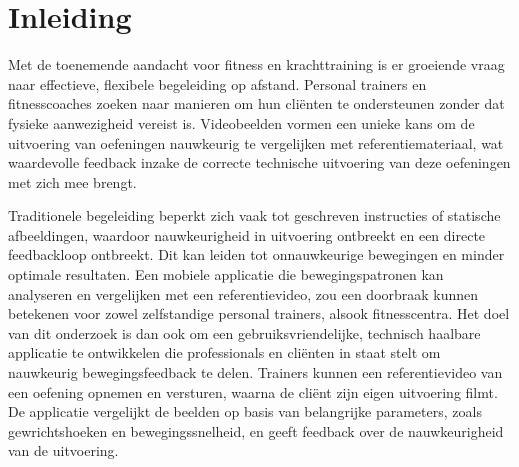 


% 

\section{Inleiding}%
\label{sec:inleiding}

Met de toenemende aandacht voor fitness en krachttraining is er groeiende vraag naar effectieve, flexibele begeleiding op afstand. Personal trainers en fitnesscoaches zoeken naar manieren om hun cliënten te ondersteunen zonder dat fysieke aanwezigheid vereist is. Videobeelden vormen een unieke kans om de uitvoering van oefeningen nauwkeurig te vergelijken met referentiemateriaal, wat waardevolle feedback inzake de correcte technische uitvoering van deze oefeningen met zich mee brengt.

Traditionele begeleiding beperkt zich vaak tot geschreven instructies of statische afbeeldingen, waardoor nauwkeurigheid in uitvoering ontbreekt en een directe feedbackloop ontbreekt. Dit kan leiden tot onnauwkeurige bewegingen en minder optimale resultaten. Een mobiele applicatie die bewegingspatronen kan analyseren en vergelijken met een referentievideo, zou een doorbraak kunnen betekenen voor zowel zelfstandige personal trainers, alsook fitnesscentra. Het doel van dit onderzoek is dan ook om een gebruiksvriendelijke, technisch haalbare applicatie te ontwikkelen die professionals en cliënten in staat stelt om nauwkeurig bewegingsfeedback te delen. Trainers kunnen een referentievideo van een oefening opnemen en versturen, waarna de cliënt zijn eigen uitvoering filmt. De applicatie vergelijkt de beelden op basis van belangrijke parameters, zoals gewrichtshoeken en bewegingssnelheid, en geeft feedback over de nauwkeurigheid van de uitvoering.

